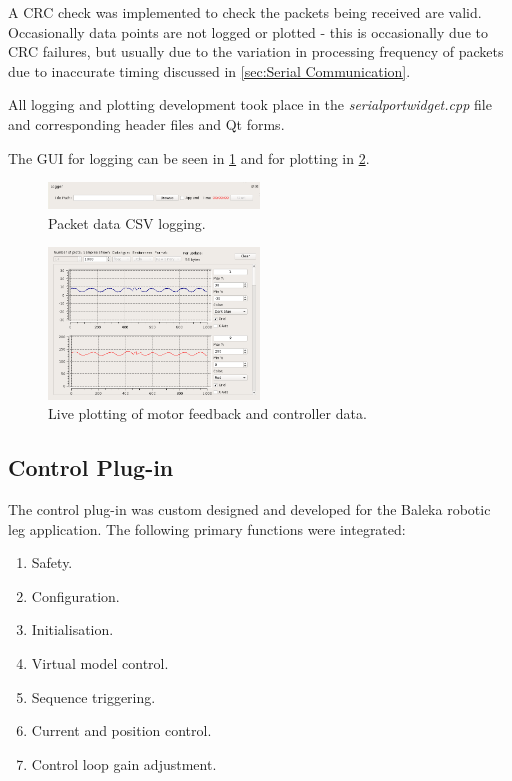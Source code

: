 A CRC check was implemented to check the packets being received are valid. Occasionally data points are not logged or plotted - this is occasionally due to CRC failures, but usually due to the variation in processing frequency of packets due to inaccurate timing discussed in \cref{sec:Serial Communication}.

All logging and plotting development took place in the \textit{serialportwidget.cpp} file and corresponding header files and Qt forms.

The GUI for logging can be seen in \cref{fig:packet-logging} and for plotting in \cref{fig:live-plotting}.\cite{jorgeaparicio2013}

\begin{figure}
\centering
\includegraphics[width=0.5\textwidth]{images/gui/logger}
\caption{Packet data CSV logging.}
\label{fig:packet-logging}
\end{figure}

\begin{figure}
\centering
\includegraphics[width=0.5\textwidth]{images/gui/plotting}
\caption{Live plotting of motor feedback and controller data.}
\label{fig:live-plotting}
\end{figure}

\subsection{Control Plug-in}

The control plug-in was custom designed and developed for the Baleka robotic leg application. The following primary functions were integrated:

\begin{enumerate}
\item Safety.
\item Configuration.
\item Initialisation.
\item Virtual model control.
\item Sequence triggering.
\item Current and position control.
\item Control loop gain adjustment.
\end{enumerate}

